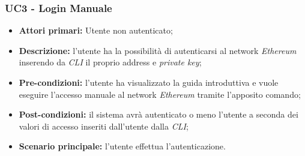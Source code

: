 \subsubsection{UC3 - Login Manuale}
\begin{itemize}
	\item \textbf{Attori primari:} Utente non autenticato;
	\item \textbf{Descrizione:} l'utente ha la possibilità di autenticarsi al network \textit{Ethereum\glo} inserendo da \textit{CLI\glo} il proprio address e \textit{private key\glos}; 
	\item \textbf{Pre-condizioni:} l'utente ha visualizzato la guida introduttiva e vuole eseguire l'accesso manuale al network \textit{Ethereum} tramite l'apposito comando;
	\item \textbf{Post-condizioni:} il sistema avrà autenticato o meno l'utente a seconda dei valori di accesso inseriti dall'utente dalla \textit{CLI\glos};
	\item \textbf{Scenario principale:} l'utente effettua l'autenticazione.
\end{itemize}